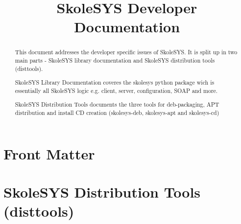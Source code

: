 \documentclass{manual}
\title{SkoleSYS Developer Documentation}
\begin{document}
\maketitle

\ifhtml
\chapter*{Front Matter\label{front}}
\fi

\begin{abstract}

\noindent
This document addresses the developer specific issues of SkoleSYS. It is
split up in two main parts - SkoleSYS library documentation and SkoleSYS
distribution tools (disttools).

SkoleSYS Library Documentation coveres the skolesys python package wich
is essentially all SkoleSYS logic e.g. client, server, configuration, SOAP
and more.

SkoleSYS Distribution Tools documents the three tools for deb-packaging,
APT distribution and install CD creation (skolesys-deb, skolesys-apt and 
skolesys-cd)

\end{abstract}

\tableofcontents

\chapter{SkoleSYS Distribution Tools (disttools)\label{disttools}} 





%



\end{document}
